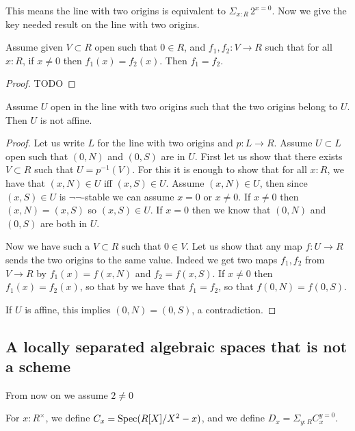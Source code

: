 This means the line with two origins is equivalent to $\Sigma_{x:R}\, 2^{x=0}$. Now we give the key needed result on the line with two origins.

\begin{lemma}\label{zero-is-regular}
Assume given $V\subset R$ open such that $0\in R$, and $f_1,f_2:V\to R$ such that for all $x:R$, if $x\not=0$ then $f_1(x)=f_2(x)$. Then $f_1=f_2$.
\end{lemma}

\begin{proof}
TODO
\end{proof}

\begin{lemma}\label{no-affine-neighborhood-of-two-origins}
Assume $U$ open in the line with two origins such that the two origins belong to $U$. Then $U$ is not affine.
\end{lemma}

\begin{proof}
Let us write $L$ for the line with two origins and $p:L\to R$. Assume $U\subset L$ open such that $(0,N)$ and $(0,S)$ are in $U$. First let us show that there exists $V\subset R$ such that $U=p^{-1}(V)$. For this it is enough to show that for all $x:R$, we have that $(x,N)\in U$ iff $(x,S)\in U$. Assume $(x,N)\in U$, then since $(x,S)\in U$ is $\neg\neg$-stable we can assume $x=0$ or $x\not=0$. If $x\not=0$ then $(x,N)=(x,S)$ so $(x,S)\in U$. If $x=0$ then we know that $(0,N)$ and $(0,S)$ are both in $U$.

Now we have such a $V\subset R$ such that $0\in V$. Let us show that any map $f:U\to R$ sends the two origins to the same value. Indeed we get two maps $f_1,f_2$ from $V\to R$ by $f_1(x) = f(x,N)$ and $f_2=f(x,S)$. If $x\not=0$ then $f_1(x)=f_2(x)$, so that by  we have that $f_1=f_2$, so that $f(0,N)=f(0,S)$.

If $U$ is affine, this implies $(0,N) = (0,S)$, a contradiction.
\end{proof}


\subsection{A locally separated algebraic spaces that is not a scheme }

From now on we assume $2\not=0$ 

\begin{definition}
For $x:R^\times$, we define $C_x = \operatorname{Spec}(R[X]/X^2-x)$, and we define $D_x = \Sigma_{y:R}C_x^{y=0}$.
\end{definition}

